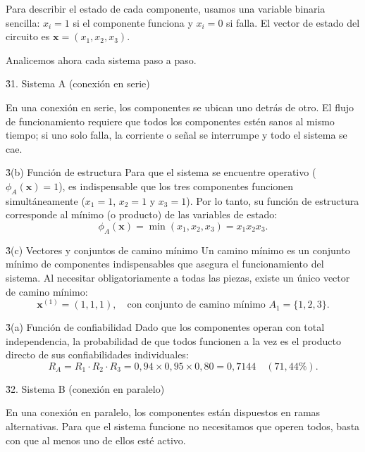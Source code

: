 \documentclass[main.tex]{subfiles}%
\begin{document}
Para describir el estado de cada componente, usamos una variable binaria sencilla: $x_i = 1$ si el componente funciona y $x_i = 0$ si falla. El vector de estado del circuito es $\mathbf{x} = (x_1, x_2, x_3)$.

Analicemos ahora cada sistema paso a paso.

\vspace{3mm}
\h3{1. Sistema A (conexión en serie)}

En una conexión en serie, los componentes se ubican uno detrás de otro. El flujo de funcionamiento requiere que todos los componentes estén sanos al mismo tiempo; si uno solo falla, la corriente o señal se interrumpe y todo el sistema se cae.

\h3{(b) Función de estructura}
Para que el sistema se encuentre operativo ($\phi_A(\mathbf{x}) = 1$), es indispensable que los tres componentes funcionen simultáneamente ($x_1 = 1$, $x_2 = 1$ y $x_3 = 1$). Por lo tanto, su función de estructura corresponde al mínimo (o producto) de las variables de estado:
\begin{equation*}
    \phi_A(\mathbf{x}) = \min(x_1, x_2, x_3) = x_1 x_2 x_3.
\end{equation*}

\h3{(c) Vectores y conjuntos de camino mínimo}
Un camino mínimo es un conjunto mínimo de componentes indispensables que asegura el funcionamiento del sistema. Al necesitar obligatoriamente a todas las piezas, existe un único vector de camino mínimo:
\begin{equation*}
    \mathbf{x}^{(1)} = (1, 1, 1), \quad \text{con conjunto de camino mínimo } A_1 = \{1, 2, 3\}.
\end{equation*}

\h3{(a) Función de confiabilidad}
Dado que los componentes operan con total independencia, la probabilidad de que todos funcionen a la vez es el producto directo de sus confiabilidades individuales:
\begin{equation*}
    R_A = R_1 \cdot R_2 \cdot R_3 = 0{,}94 \times 0{,}95 \times 0{,}80 = 0{,}7144 \quad (71{,}44\%).
\end{equation*}

\vspace{3mm}
\h3{2. Sistema B (conexión en paralelo)}

En una conexión en paralelo, los componentes están dispuestos en ramas alternativas. Para que el sistema funcione no necesitamos que operen todos, basta con que al menos uno de ellos esté activo.
\end{document}
